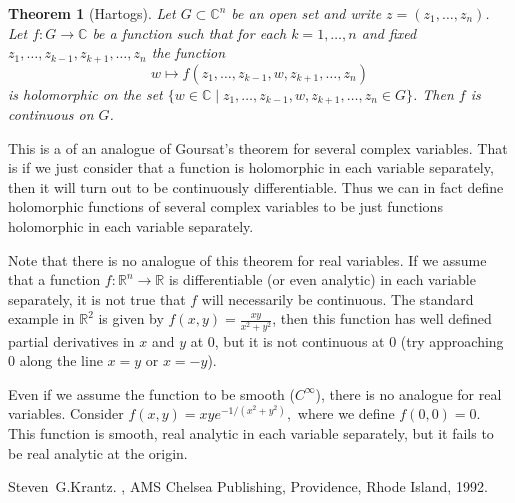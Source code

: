 \documentclass[12pt]{article}
\theoremstyle{theorem}
\newtheorem*{thm}{Theorem}
\theoremstyle{definition}
\begin{document}
\begin{thm}[Hartogs]
Let $G \subset {\mathbb{C}}^n$ be an open set and write
$z = (z_1,\ldots,z_n)$.  Let $f \colon G \to {\mathbb{C}}$ be a function 
such that for each $k = 1,\ldots,n$ and fixed $z_1,\ldots,z_{k-1},z_{k+1},\ldots,z_n$ the function
\begin{equation*}
w \mapsto f(z_1,\ldots,z_{k-1},w,z_{k+1},\ldots,z_n)
\end{equation*}
is holomorphic on the set $\{ w \in {\mathbb{C}} \mid
z_1,\ldots,z_{k-1},w,z_{k+1},\ldots,z_n \in G \}$.  Then
$f$ is continuous on $G$.
\end{thm}

This is a  of an analogue of Goursat's theorem for several complex variables.  That is if we just consider that a function is holomorphic in each
variable separately, then it will turn out to be continuously differentiable.  Thus we can in fact define holomorphic functions of several complex variables to be just functions holomorphic in each variable separately.

Note that there is no analogue of this theorem for real variables.  If we
assume that a function $f \colon {\mathbb{R}}^n \to {\mathbb{R}}$ is 
differentiable (or even analytic) in each variable separately, it is not true that $f$ will necessarily be continuous.  The standard example in ${\mathbb{R}}^2$ is given by $f(x,y) = \frac{xy}{x^2+y^2}$, then this function has well defined partial derivatives in $x$ and $y$ at 0, but it is not continuous at 0 (try approaching 0 along the line $x=y$ or $x=-y$).

Even if we assume the function to be smooth ($C^\infty$), there is no analogue for real variables.  Consider $f(x,y) = xye^{-1/(x^2+y^2)},$ where we define $f(0,0) = 0.$  This function is smooth, real analytic in each variable
separately, but it fails to be real analytic at the origin. 

\begin{thebibliography}{9}
Steven~G.\@ Krantz.
{\em {}},
AMS Chelsea Publishing, Providence, Rhode Island, 1992.
\end{thebibliography}
\end{document}
